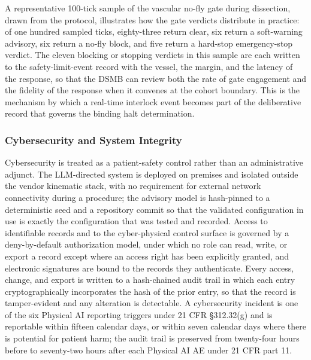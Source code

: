A representative 100-tick sample of the vascular no-fly gate during dissection,
drawn from the protocol, illustrates how the gate verdicts distribute in practice:
of one hundred sampled ticks, eighty-three return clear, six return a soft-warning
advisory, six return a no-fly block, and five return a hard-stop emergency-stop
verdict. The eleven blocking or stopping verdicts in this sample are each written to
the safety-limit-event record with the vessel, the margin, and the latency of the
response, so that the DSMB can review both the rate of gate engagement and the
fidelity of the response when it convenes at the cohort boundary. This is the
mechanism by which a real-time interlock event becomes part of the deliberative
record that governs the binding halt determination.

\subsubsection{Cybersecurity and System Integrity}

Cybersecurity is treated as a patient-safety control rather than an administrative
adjunct. The LLM-directed system is deployed on premises and isolated outside the
vendor kinematic stack, with no requirement for external network connectivity during
a procedure; the advisory model is hash-pinned to a deterministic seed and a
repository commit so that the validated configuration in use is exactly the
configuration that was tested and recorded. Access to identifiable records and to
the cyber-physical control surface is governed by a deny-by-default authorization
model, under which no role can read, write, or export a record except where an
access right has been explicitly granted, and electronic signatures are bound to the
records they authenticate. Every access, change, and export is written to a
hash-chained audit trail in which each entry cryptographically incorporates the hash
of the prior entry, so that the record is tamper-evident and any alteration is
detectable. A cybersecurity incident is one of the six Physical AI reporting
triggers under 21 CFR \S 312.32(g) and is reportable within fifteen calendar days,
or within seven calendar days where there is potential for patient harm; the audit
trail is preserved from twenty-four hours before to seventy-two hours after each
Physical AI AE under 21 CFR part 11.

